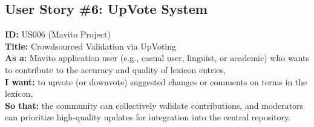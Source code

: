 \documentclass[12pt]{article}
\begin{document}
\subsection{User Story \#6: UpVote System}

\textbf{ID:} US006 (Mavito Project) \\
\textbf{Title:} Crowdsourced Validation via UpVoting \\
\textbf{As a:} Mavito application user (e.g., casual user, linguist, or academic) who wants to contribute to the accuracy and quality of lexicon entries, \\
\textbf{I want:} to upvote (or downvote) suggested changes or comments on terms in the lexicon, \\
\textbf{So that:} the community can collectively validate contributions, and moderators can prioritize high-quality updates for integration into the central repository.
\end{document}
